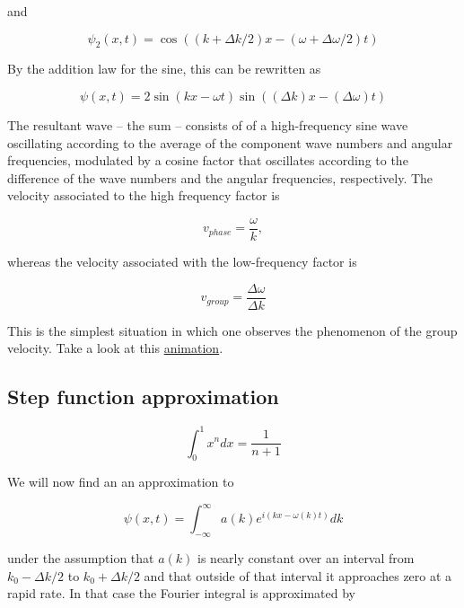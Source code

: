 and

\begin{equation}
\psi_2(x,t)  = \cos((k + \Delta k/2)x - (\omega + \Delta \omega/2)t)
\end{equation}

By the addition law for the sine, this can be rewritten as

\begin{equation}
\psi(x,t) = 2\sin(kx - \omega t)\sin((\Delta k)x - (\Delta \omega)t)
\end{equation}


The resultant wave -- the sum -- consists of of a high-frequency sine wave oscillating according to the average of the component wave numbers and angular frequencies, modulated by a cosine factor that oscillates according to the difference of the wave numbers and the angular frequencies, respectively.  The velocity associated to the high frequency factor is

\begin{equation}
v_{phase} = \frac{\omega}{k},
\end{equation}

whereas the velocity associated with the low-frequency factor is

\begin{equation}
v_{group} = \frac{\Delta \omega}{\Delta k}
\end{equation}

This is the simplest situation in which one observes the phenomenon of the group velocity.  Take a look at this \href{https://galileo.phys.virginia.edu/classes/109N/more_stuff/Applets/wavepacket/wavepacket.html}{animation}.


\subsection{Step function approximation}

$$
\int_0^1 x^n dx = \frac{1}{n+1}
$$


We will now find an an approximation to

\begin{equation}
\psi(x,t) = \int_{-\infty}^\infty a(k) e^{i(kx - \omega(k)t)} dk
\end{equation}

under the assumption that $a(k)$ is nearly constant over an interval from $k_0 -\Delta k/2$ to $k_0 + \Delta k/2$ and that outside of that interval it approaches zero at a rapid rate.  In that case the Fourier integral is approximated by

